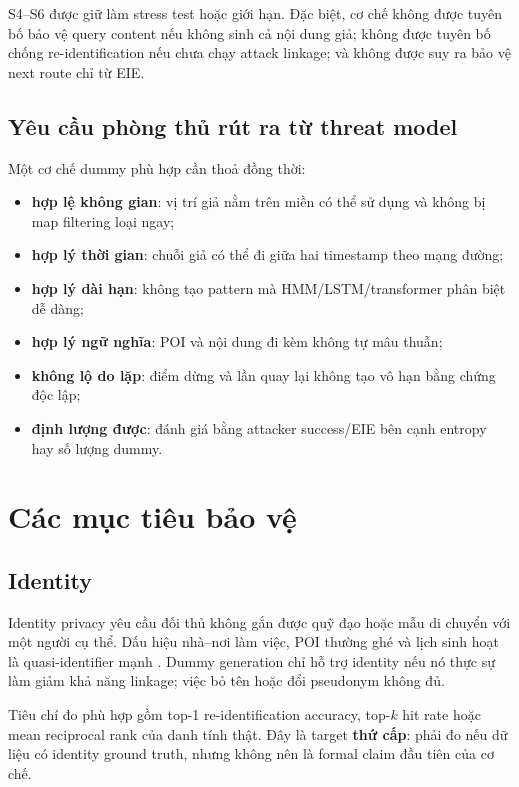 \documentclass[12pt,a4paper,oneside]{report}
\begin{document}
S4--S6 được giữ làm stress test hoặc giới hạn. Đặc biệt, cơ chế không được tuyên bố bảo vệ query content nếu không sinh cả nội dung giả; không được tuyên bố chống re-identification nếu chưa chạy attack linkage; và không được suy ra bảo vệ next route chỉ từ EIE.

\section{Yêu cầu phòng thủ rút ra từ threat model}

Một cơ chế dummy phù hợp cần thoả đồng thời:

\begin{itemize}
  \item \textbf{hợp lệ không gian}: vị trí giả nằm trên miền có thể sử dụng và không bị map filtering loại ngay;
  \item \textbf{hợp lý thời gian}: chuỗi giả có thể đi giữa hai timestamp theo mạng đường;
  \item \textbf{hợp lý dài hạn}: không tạo pattern mà HMM/LSTM/transformer phân biệt dễ dàng;
  \item \textbf{hợp lý ngữ nghĩa}: POI và nội dung đi kèm không tự mâu thuẫn;
  \item \textbf{không lộ do lặp}: điểm dừng và lần quay lại không tạo vô hạn bằng chứng độc lập;
  \item \textbf{định lượng được}: đánh giá bằng attacker success/EIE bên cạnh entropy hay số lượng dummy.
\end{itemize}

\chapter{Các mục tiêu bảo vệ}

\section{Identity}

Identity privacy yêu cầu đối thủ không gắn được quỹ đạo hoặc mẫu di chuyển với một người cụ thể. Dấu hiệu nhà--nơi làm việc, POI thường ghé và lịch sinh hoạt là quasi-identifier mạnh \citep{demontjoye2013unique}. Dummy generation chỉ hỗ trợ identity nếu nó thực sự làm giảm khả năng linkage; việc bỏ tên hoặc đổi pseudonym không đủ.

Tiêu chí đo phù hợp gồm top-1 re-identification accuracy, top-$k$ hit rate hoặc mean reciprocal rank của danh tính thật. Đây là target \textbf{thứ cấp}: phải đo nếu dữ liệu có identity ground truth, nhưng không nên là formal claim đầu tiên của cơ chế.
\end{document}
